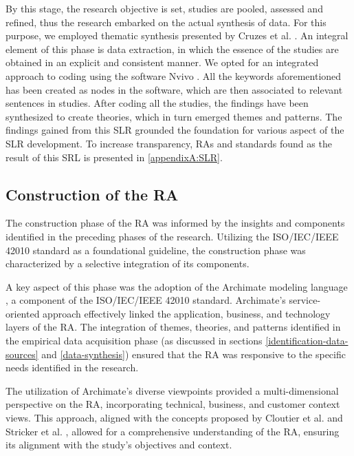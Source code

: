 \documentclass[review]{elsarticle}
\begin{document}
By this stage, the research objective is set, studies are pooled, assessed and refined, thus the research embarked on the actual synthesis of data. For this purpose, we employed thematic synthesis presented by Cruzes et al. \cite{cruzes2011recommended}. An integral element of this phase is data extraction, in which the essence of the studies are obtained in an explicit and consistent manner. We opted for an integrated approach to coding \cite{lofland1971analyzing} using the software Nvivo \cite{nvivo}. All the keywords aforementioned has been created as nodes in the software, which are then associated to relevant sentences in studies. After coding all the studies, the findings have been synthesized to create theories, which in turn emerged themes and patterns. The findings gained from this SLR grounded the foundation for various aspect of the SLR development. To increase transparency, RAs and standards found as the result of this SRL is presented in \ref{appendixA:SLR}. 
   
\subsection{Construction of the RA}

The construction phase of the RA was informed by the insights and components identified in the preceding phases of the research. Utilizing the ISO/IEC/IEEE 42010 standard \cite{ISO42010} as a foundational guideline, the construction phase was characterized by a selective integration of its components.

A key aspect of this phase was the adoption of the Archimate modeling language \cite{lankhorst2013language}, a component of the ISO/IEC/IEEE 42010 standard. Archimate's service-oriented approach effectively linked the application, business, and technology layers of the RA. The integration of themes, theories, and patterns identified in the empirical data acquisition phase (as discussed in sections \ref{identification-data-sources} and \ref{data-synthesis}) ensured that the RA was responsive to the specific needs identified in the research.

The utilization of Archimate's diverse viewpoints provided a multi-dimensional perspective on the RA, incorporating technical, business, and customer context views. This approach, aligned with the concepts proposed by Cloutier et al. \cite{Cloutier} and Stricker et al. \cite{Stricker}, allowed for a comprehensive understanding of the RA, ensuring its alignment with the study's objectives and context.
\end{document}

